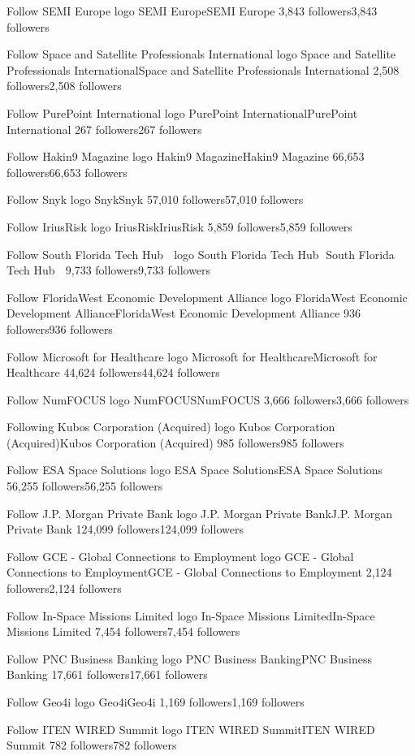 Follow
SEMI Europe logo
SEMI EuropeSEMI Europe
3,843 followers3,843 followers

Follow
Space and Satellite Professionals International logo
Space and Satellite Professionals InternationalSpace and Satellite Professionals International
2,508 followers2,508 followers

Follow
PurePoint International logo
PurePoint InternationalPurePoint International
267 followers267 followers

Follow
Hakin9 Magazine logo
Hakin9 MagazineHakin9 Magazine
66,653 followers66,653 followers

Follow
Snyk logo
SnykSnyk
57,010 followers57,010 followers

Follow
IriusRisk logo
IriusRiskIriusRisk
5,859 followers5,859 followers

Follow
South Florida Tech Hub 🌴 logo
South Florida Tech Hub 🌴South Florida Tech Hub 🌴
9,733 followers9,733 followers

Follow
FloridaWest Economic Development Alliance logo
FloridaWest Economic Development AllianceFloridaWest Economic Development Alliance
936 followers936 followers

Follow
Microsoft for Healthcare logo
Microsoft for HealthcareMicrosoft for Healthcare
44,624 followers44,624 followers

Follow
NumFOCUS logo
NumFOCUSNumFOCUS
3,666 followers3,666 followers

Following
Kubos Corporation (Acquired) logo
Kubos Corporation (Acquired)Kubos Corporation (Acquired)
985 followers985 followers

Follow
ESA Space Solutions logo
ESA Space SolutionsESA Space Solutions
56,255 followers56,255 followers

Follow
J.P. Morgan Private Bank logo
J.P. Morgan Private BankJ.P. Morgan Private Bank
124,099 followers124,099 followers

Follow
GCE - Global Connections to Employment logo
GCE - Global Connections to EmploymentGCE - Global Connections to Employment
2,124 followers2,124 followers

Follow
In-Space Missions Limited logo
In-Space Missions LimitedIn-Space Missions Limited
7,454 followers7,454 followers

Follow
PNC Business Banking logo
PNC Business BankingPNC Business Banking
17,661 followers17,661 followers

Follow
Geo4i logo
Geo4iGeo4i
1,169 followers1,169 followers

Follow
ITEN WIRED Summit logo
ITEN WIRED SummitITEN WIRED Summit
782 followers782 followers

